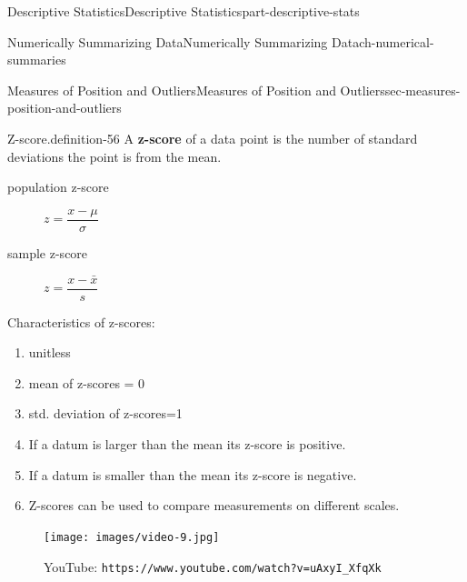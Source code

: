 \documentclass[oneside,10pt,]{book}
\newcommand{\mono}[1]{\texttt{#1}}
\newcommand{\terminology}[1]{\textbf{#1}}
\numberwithin{equation}{section}
\newlength{\qrsize}
\newlength{\previewwidth}
\begin{document}
\begin{partptx}{Descriptive Statistics}{}{Descriptive Statistics}{}{}{part-descriptive-stats}
\begin{chapterptx}{Numerically Summarizing Data}{}{Numerically Summarizing Data}{}{}{ch-numerical-summaries}
\typeout{************************************************}
%
\begin{sectionptx}{Measures of Position and Outliers}{}{Measures of Position and Outliers}{}{}{sec-measures-position-and-outliers}
\begin{definition}{Z-score.}{definition-56}%
\hypertarget{p-101}{}%
A \terminology{z-score} of a data point is the number of standard deviations the point is from the mean.%
\leavevmode%
\begin{description}
\item[{population z-score}]\hypertarget{li-60}{}\hypertarget{p-102}{}%
\(z = \dfrac{x-\mu}{\sigma}\)%
\item[{sample z-score}]\hypertarget{li-61}{}\hypertarget{p-103}{}%
\(z = \dfrac{x-\bar{x}}{s}\)%
\end{description}
 Characteristics of z-scores: \leavevmode%
\begin{enumerate}
\item\hypertarget{li-62}{}unitless%
\item\hypertarget{li-63}{}mean of z-scores = 0%
\item\hypertarget{li-64}{}std. deviation of z-scores=1%
\item\hypertarget{li-65}{}If a datum is larger than the mean its z-score is positive.%
\item\hypertarget{li-66}{}If a datum is smaller than the mean its z-score is negative.%
\item\hypertarget{li-67}{}Z-scores can be used to compare measurements on different scales.%
\end{enumerate}
\end{definition}
\begin{figure}
\centering
\setlength{\qrsize}{9em}
\setlength{\previewwidth}{\linewidth}
\addtolength{\previewwidth}{-\qrsize}
\begin{tcbraster}[raster columns=2, raster column skip=1pt, raster halign=center, raster force size=false, raster left skip=0pt, raster right skip=0pt]%
\begin{tcolorbox}[previewstyle, width=\previewwidth]%
\texttt{[image: images/video-9.jpg]}%
\end{tcolorbox}%
\begin{tcolorbox}[qrstyle]%
{\hypersetup{urlcolor=black}}%
\end{tcolorbox}%
\begin{tcolorbox}[captionstyle]%
\small YouTube: \mono{https://www.youtube.com/watch?v=uAxyI\_XfqXk}\end{tcolorbox}%

\end{tcbraster}
\end{figure}
\end{sectionptx}
\end{chapterptx}
\end{partptx}
\end{document}
